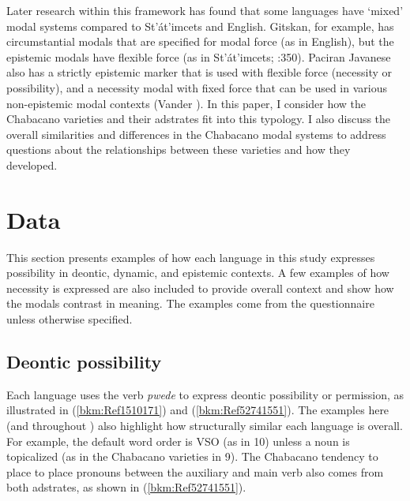 \documentclass[output=paper]{langsci/langscibook}
\begin{document}
Later research within this framework has found that some languages have ‘mixed’ modal systems compared to St’át’imcets and English. Gitskan, for example, has circumstantial modals that are specified for modal force (as in English), but the epistemic modals have flexible force (as in St’át’imcets; \citealt{Matthewson2013}:350). Paciran Javanese also has a strictly epistemic marker that is used with flexible force (necessity or possibility), and a necessity modal with fixed force that can be used in various non-epistemic modal contexts (Vander \citealt{Klok2013}). In this paper, I consider how the Chabacano varieties and their adstrates fit into this typology. I also discuss the overall similarities and differences in the Chabacano modal systems to address questions about the relationships between these varieties and how they developed.

\section{Data}

This section presents examples of how each language in this study expresses possibility in deontic, dynamic, and epistemic contexts. A few examples of how necessity is expressed are also included to provide overall context and show how the modals contrast in meaning. The examples come from the questionnaire unless otherwise specified.

\subsection{Deontic possibility}

Each language uses the verb \textit{pwede} to express deontic possibility or permission, as illustrated in (\ref{bkm:Ref1510171}) and (\ref{bkm:Ref52741551}). The examples here (and throughout ) also highlight how structurally similar each language is overall. For example, the default word order is VSO (as in 10) unless a noun is topicalized (as in the Chabacano varieties in 9). The Chabacano tendency to place to place pronouns between the auxiliary and main verb also comes from both adstrates, as shown in (\ref{bkm:Ref52741551}).  
\end{document}
